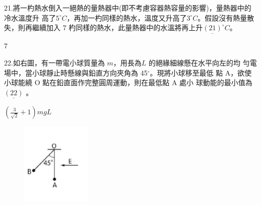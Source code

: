 \documentclass[cn,10pt,math=newtx,chinesefont=founder,device=ig]{elegantbook}
\begin{document}
\begin{example}
   21.將一杓熱水倒入一絕熱的量熱器中(即不考慮容器熱容量的影響)，量熱器中的冷水溫度升
高了$5^\circ C$，再加一杓同樣的熱水，溫度又升高了$3^\circ C$。假設沒有熱量散失，則再繼續加入 $7$
杓同樣的熱水，此量熱器中的水溫將再上升$\underline{(21)}^\circ C$。\\
    \rightline{[文華高中教甄109]}
\end{example}
\begin{solution}
    $7$
\end{solution}

\newpage


\begin{example}
   22.如右圖，有一帶電小球質量為 $m$，用長為$L$ 的絕緣細線懸在水平向左的均
勻電場中，當小球靜止時懸線與鉛直方向夾角為 45$^\circ$。現將小球移至最低
點 A，欲使小球能繞 O 點在鉛直面作完整圓周運動，則在最低點 A 處小
球動能的最小值為$\underline{(22)}$  。\\
    \rightline{[文華高中教甄109]}
\end{example}
\begin{solution}
    $(\frac{3}{\sqrt{2}}+1) mgL$
\end{solution}
\begin{figure}[htbp]
    \flushright
    \includegraphics[width=0.3\textwidth]{image/109文華22.png}
  \end{figure}
\newpage
\end{document}
